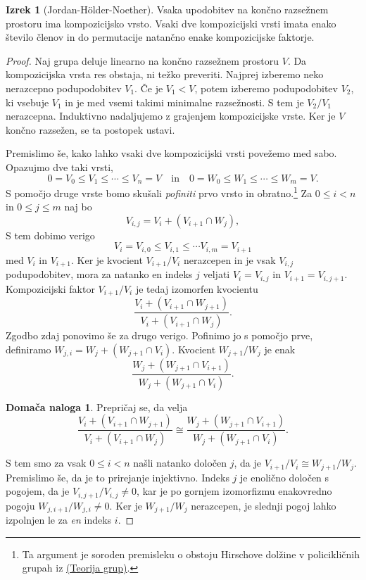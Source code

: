 \documentclass[11pt]{book}
\theoremstyle{definition}
\theoremstyle{zgled}
\theoremstyle{odprtproblem}
\theoremstyle{domacanaloga}
\newtheorem*{domacanaloga}{Domača naloga}
\newenvironment{dokaz}
    {\color{siva}\begin{proof}}
    {\end{proof}}
\theoremstyle{izrek}
\newtheorem*{izrek}{Izrek}
\begin{document}
\begin{izrek}[Jordan-Hölder-Noether]
Vsaka upodobitev na končno razsežnem prostoru ima kompozicijsko vrsto. Vsaki dve kompozicijski vrsti imata enako število členov in do permutacije natančno enake kompozicijske faktorje.
\end{izrek}
\begin{dokaz}
Naj grupa deluje linearno na končno razsežnem prostoru $V$. Da kompozicijska vrsta res obstaja, ni težko preveriti. Najprej izberemo neko nerazcepno podupodobitev $V_1$. Če je $V_1 < V$, potem izberemo podupodobitev $V_2$, ki vsebuje $V_1$ in je med vsemi takimi minimalne razsežnosti. S tem je $V_2/V_1$ nerazcepna. Induktivno nadaljujemo z grajenjem kompozicijske vrste. Ker je $V$ končno razsežen, se ta postopek ustavi.

Premislimo še, kako lahko vsaki dve kompozicijski vrsti povežemo med sabo. Opazujmo dve taki vrsti,
\[
    0 = V_0 \leq V_1 \leq \cdots \leq V_n = V 
    \quad \text{in} \quad
    0 = W_0 \leq W_1 \leq \cdots \leq W_m = V.
\]
S pomočjo druge vrste bomo skušali \emph{pofiniti} prvo vrsto in obratno.\footnote{Ta argument je soroden premisleku o obstoju Hirschove dolžine v policikličnih grupah iz \href{https://ucilnica2122.fmf.uni-lj.si/course/view.php?id=309}{(Teorija grup)}.} Za $0 \leq i < n$ in $0 \leq j \leq m$ naj bo
\[
    V_{i,j} = V_i + (V_{i+1} \cap W_j),
\]
S tem dobimo verigo
\[
    V_i = V_{i,0} \leq V_{i,1} \leq \cdots V_{i,m} = V_{i+1}
\]
med $V_i$ in $V_{i+1}$. Ker je kvocient $V_{i+1}/V_i$ nerazcepen in je vsak $V_{i,j}$ podupodobitev, mora za natanko en indeks $j$ veljati $V_i = V_{i,j}$ in $V_{i+1} = V_{i,j+1}$. Kompozicijski faktor $V_{i+1}/V_i$ je tedaj izomorfen kvocientu
\[
    \frac{V_i + (V_{i+1} \cap W_{j+1})}{V_i + (V_{i+1} \cap W_j)}.
\]
Zgodbo zdaj ponovimo še za drugo verigo. Pofinimo jo s pomočjo prve, definiramo $W_{j,i} = W_j + (W_{j+1} \cap V_i)$. Kvocient $W_{j+1}/W_j$ je enak
\[
    \frac{W_j + (W_{j+1} \cap V_{i+1})}{W_j + (W_{j+1} \cap V_i)}.
\]

\begin{domacanaloga}
Prepričaj se, da velja
\[
    \frac{V_i + (V_{i+1} \cap W_{j+1})}{V_i + (V_{i+1} \cap W_j)}
    \cong
    \frac{W_j + (W_{j+1} \cap V_{i+1})}{W_j + (W_{j+1} \cap V_i)}.
\]
\end{domacanaloga}

S tem smo za vsak $0 \leq i < n$ našli natanko določen $j$, da je $V_{i+1}/V_i \cong W_{j+1}/W_j$. Premislimo še, da je to prirejanje injektivno. Indeks $j$ je enolično določen s pogojem, da je $V_{i,j+1}/V_{i,j} \neq 0$, kar je po gornjem izomorfizmu enakovredno pogoju $W_{j,i+1}/W_{j,i} \neq 0$. Ker je $W_{j+1}/W_j$ nerazcepen, je slednji pogoj lahko izpolnjen le za \emph{en} indeks $i$.
\end{dokaz}
\end{document}
